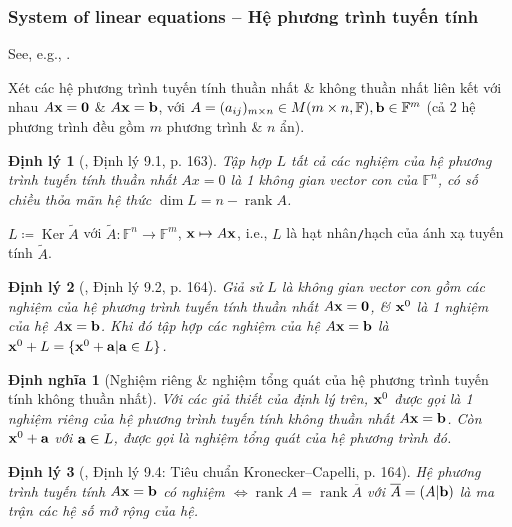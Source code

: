 \documentclass{article}
\newtheorem{dinhly}{Định lý}
\newtheorem{dinhnghia}{Định nghĩa}
\begin{document}
\subsubsection{System of linear equations -- Hệ phương trình tuyến tính}
See, e.g., \cite[Chap. 3, \S9: Cấu trúc nghiệm của hệ phương trình tuyến tính, pp. 163--165]{Hung_linear_algebra}.

Xét các hệ phương trình tuyến tính thuần nhất \& không thuần nhất liên kết với nhau $A{\bf x} = {\bf0}$ \& $A{\bf x} = {\bf b}$, với $A = (a_{ij})_{m\times n}\in M(m\times n,\mathbb{F}),{\bf b}\in\mathbb{F}^m$ (cả 2 hệ phương trình đều gồm $m$ phương trình \& $n$ ẩn).

\begin{dinhly}[\cite{Hung_linear_algebra}, Định lý 9.1, p. 163]
	Tập hợp $L$ tất cả các nghiệm của hệ phương trình tuyến tính thuần nhất $Ax = 0$ là 1 không gian vector con của $\mathbb{F}^n$, có số chiều thỏa mãn hệ thức $\dim L = n - \operatorname{rank}A$.
\end{dinhly}
$L\coloneqq\operatorname{Ker}\tilde{A}$ với $\tilde{A}:\mathbb{F}^n\to\mathbb{F}^m$, ${\bf x}\mapsto A{\bf x}$, i.e., $L$ là hạt nhân{\tt/}hạch của ánh xạ tuyến tính $\tilde{A}$.

\begin{dinhly}[\cite{Hung_linear_algebra}, Định lý 9.2, p. 164]
	Giả sử $L$ là không gian vector con gồm các nghiệm của hệ phương trình tuyến tính thuần nhất $A{\bf x} = {\bf0}$, \& ${\bf x}^0$ là 1 nghiệm của hệ $A{\bf x} = {\bf b}$. Khi đó tập hợp các nghiệm của hệ $A{\bf x} = {\bf b}$ là ${\bf x}^0 + L = \{{\bf x}^0 + {\bf a}|{\bf a}\in L\}$.
\end{dinhly}

\begin{dinhnghia}[Nghiệm riêng \& nghiệm tổng quát của hệ phương trình tuyến tính không thuần nhất]
	Với các giả thiết của định lý trên, ${\bf x}^0$ được gọi là 1 \emph{nghiệm riêng} của hệ phương trình tuyến tính không thuần nhất $A{\bf x} = {\bf b}$. Còn ${\bf x}^0 + {\bf a}$ với ${\bf a}\in L$, được gọi là \emph{nghiệm tổng quát} của hệ phương trình đó.
\end{dinhnghia}

\begin{dinhly}[\cite{Hung_linear_algebra}, Định lý 9.4: Tiêu chuẩn Kronecker--Capelli, p. 164]
	Hệ phương trình tuyến tính $A{\bf x} = {\bf b}$ có nghiệm $\Leftrightarrow\operatorname{rank}A = \operatorname{rank}\overline{A}$ với $\overline{A} = (A|{\bf b})$ là ma trận các hệ số mở rộng của hệ.
\end{dinhly}
\end{document}
